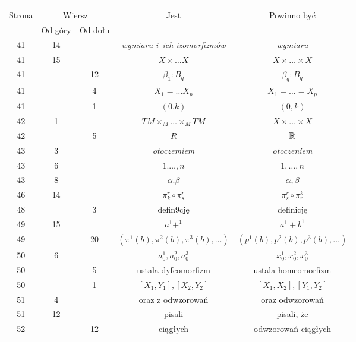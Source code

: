 \documentclass[a4paper,11pt]{article}
\begin{document}
\begin{center}
  \begin{tabular}{|c|c|c|c|c|}
    \hline
    & \multicolumn{2}{c|}{} & & \\
    Strona & \multicolumn{2}{c|}{Wiersz} & Jest
                              & Powinno być \\ \cline{2-3}
    & Od góry & Od dołu & & \\
    \hline
    41  & 14 & & \textit{wymiaru i~ich izomorfizmów} & \textit{wymiaru} \\
    41  & 15 & & $X \times \ldots X$ & $X \times \ldots \times X$ \\
    41  & & 12 & $\beta_{ 1 } : B_{ q }$ & $\beta_{ q } : B_{ q }$ \\
    41  & &  4 & $X_{ 1 } = \ldots X_{ p }$
           & $X_{ 1 } = \ldots = X_{ p }$ \\
    41  & &  1 & $( 0. k )$ & $( 0, k )$ \\
    42  &  1 & & $TM \times_{ M } \ldots \times_{ M } TM$ & $X \times \ldots \times X$ \\
    42  & &  5 & $R$ & $\mathbb{R}$ \\
    43  &  3 & & \textit{otoczemiem} & \textit{otoczeniem} \\
    43  &  6 & & $1 . \ldots, n$ & $1, \ldots, n$ \\
    43  &  8 & & $\alpha. \beta$ & $\alpha, \beta$ \\
    46  & 14 & & $\pi_{ k }^{ r } \circ \pi^{ r }_{ s }$
           & $\pi_{ s }^{ r } \circ \pi^{ k }_{ r }$ \\
    48  & &  3 & defin9cję & definicję \\
    49  & 15 & & $a^{ 1 } + ^{ 1 }$ & $a^{ 1 } + b^{ 1 }$ \\
    49  & & 20 & $( \pi^{ 1 } ( b ), \pi^{ 2 } ( b ), \pi^{ 3 } ( b ), \ldots )$
           & $( p^{ 1 } ( b ), p^{ 2 } ( b ), p^{ 3 } ( b ), \ldots )$ \\
    50  &  6 & & $a_{ 0 }^{ 1 }, a_{ 0 }^{ 2 }, a_{ 0 }^{ 3 }$
           & $x_{ 0 }^{ 1 }, x_{ 0 }^{ 2 }, x_{ 0 }^{ 3 }$ \\
    50  & &  5 & ustala dyfeomorfizm & ustala homeomorfizm \\
    50  & & 1 & $[ X_{ 1 }, Y_{ 1 }], [ X_{ 2 }, Y_{ 2 } ]$
           & $[ X_{ 1 }, X_{ 2 }], [ Y_{ 1 }, Y_{ 2 } ]$ \\
    51  &  4 & & oraz z odwzorowań & oraz odwzorowań \\
    51  & 12 & & pisali & pisali, że \\
    52  & & 12 & ciągłych & odwzorowań ciągłych \\

\end{tabular}
\end{center}
\end{document}
